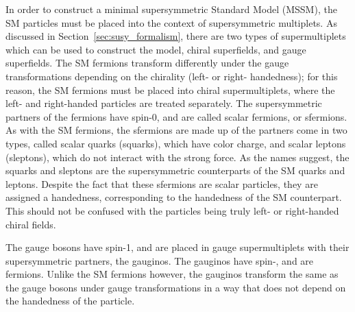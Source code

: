 In order to construct a minimal supersymmetric Standard Model (MSSM), the SM
particles must be placed into the context of supersymmetric multiplets.
As discussed in Section~\ref{sec:susy_formalism}, there are two types of
supermultiplets which can be used to construct the model, chiral superfields,
and gauge superfields.
The SM fermions transform differently under the gauge transformations depending
on the chirality (left- or right- handedness); for this reason, the SM fermions
must be placed into chiral supermultiplets, where the left- and right-handed
particles are treated separately.
The supersymmetric partners of the fermions have spin-0, and are called
scalar fermions, or sfermions.
As with the SM fermions, the sfermions are made up of the partners come in
two types, called scalar quarks (squarks), which have color charge, and scalar
leptons (sleptons), which do not interact with the strong force.
As the names suggest, the squarks and sleptons are the supersymmetric
counterparts of the SM quarks and leptons.
Despite the fact that these sfermions are scalar particles, they are assigned
a handedness, corresponding to the handedness of the SM counterpart.
This should not be confused with the particles being truly left- or
right-handed chiral fields.

The gauge bosons have spin-1, and are placed in gauge supermultiplets with
their supersymmetric partners, the gauginos.
The gauginos have spin-, and are fermions.
Unlike the SM fermions however, the gauginos transform the same as the gauge
bosons under gauge transformations in a way that does not depend on the
handedness of the particle.

